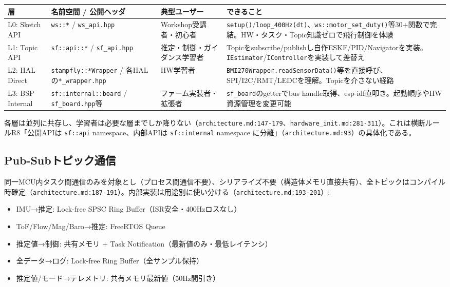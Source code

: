 \documentclass[a4paper,10pt]{ltjsarticle}
\begin{document}
\begin{table}[h]
\centering\footnotesize
\begin{tabularx}{\textwidth}{@{}lllY@{}}
\toprule
層 & 名前空間 / 公開ヘッダ & 典型ユーザー & できること \\
\midrule
L0: Sketch API & \texttt{ws::*} / \texttt{ws\_api.hpp} & Workshop受講者・初心者 & \texttt{setup()}/\texttt{loop\_400Hz(dt)}、\texttt{ws::motor\_set\_duty()}等30+関数で完結。HW・タスク・Topic知識ゼロで飛行制御を体験 \\
L1: Topic API & \texttt{sf::api::*} / \texttt{sf\_api.hpp} & 推定・制御・ガイダンス学習者 & Topicをsubscribe/publishし自作ESKF/PID/Navigatorを実装。\texttt{IEstimator}/\texttt{IController}を実装して差替え \\
L2: HAL Direct & \texttt{stampfly::*Wrapper} / 各HALの\texttt{*\_wrapper.hpp} & HW学習者 & \texttt{BMI270Wrapper.readSensorData()}等を直接呼び、SPI/I2C/RMT/LEDCを理解。Topicを介さない経路 \\
L3: BSP Internal & \texttt{sf::internal::board} / \texttt{sf\_board.hpp}等 & ファーム実装者・拡張者 & \texttt{sf\_board}のgetterでbus handle取得、esp-idf直叩き。起動順序やHW資源管理を変更可能 \\
\bottomrule
\end{tabularx}
\end{table}

各層は並列に共存し、学習者は必要な層までしか降りない（\texttt{architecture.md:147-179}、\texttt{hardware\_init.md:281-311}）。これは横断ルールR8「公開APIは \texttt{sf::api} namespace、内部APIは \texttt{sf::internal} namespace に分離」（\texttt{architecture.md:93}）の具体化である。

\subsection{Pub-Subトピック通信}

同一MCU内タスク間通信のみを対象とし（プロセス間通信不要）、シリアライズ不要（構造体メモリ直接共有）、全トピックはコンパイル時確定（\texttt{architecture.md:187-191}）。内部実装は用途別に使い分ける（\texttt{architecture.md:193-201}）:

\begin{itemize}[leftmargin=*]
  \item IMU→推定: Lock-free SPSC Ring Buffer（ISR安全・400Hzロスなし）
  \item ToF/Flow/Mag/Baro→推定: FreeRTOS Queue
  \item 推定値→制御: 共有メモリ + Task Notification（最新値のみ・最低レイテンシ）
  \item 全データ→ログ: Lock-free Ring Buffer（全サンプル保持）
  \item 推定値/モード→テレメトリ: 共有メモリ最新値（50Hz間引き）
\end{itemize}
\end{document}
